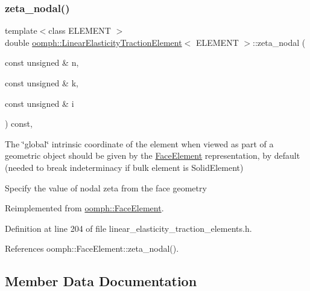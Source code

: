\subsubsection{\texorpdfstring{zeta\+\_\+nodal()}{zeta\_nodal()}}
{\footnotesize\ttfamily template$<$class E\+L\+E\+M\+E\+NT $>$ \\
double \hyperlink{classoomph_1_1LinearElasticityTractionElement}{oomph\+::\+Linear\+Elasticity\+Traction\+Element}$<$ E\+L\+E\+M\+E\+NT $>$\+::zeta\+\_\+nodal (\begin{DoxyParamCaption}\item[{const unsigned \&}]{n,  }\item[{const unsigned \&}]{k,  }\item[{const unsigned \&}]{i }\end{DoxyParamCaption}) const\hspace{0.3cm}{\ttfamily [inline]}, {\ttfamily [virtual]}}



The \char`\"{}global\char`\"{} intrinsic coordinate of the element when viewed as part of a geometric object should be given by the \hyperlink{classoomph_1_1FaceElement}{Face\+Element} representation, by default (needed to break indeterminacy if bulk element is Solid\+Element) 

Specify the value of nodal zeta from the face geometry 

Reimplemented from \hyperlink{classoomph_1_1FaceElement_a58c9f93705c7741f76c8487d152e68a6}{oomph\+::\+Face\+Element}.



Definition at line 204 of file linear\+\_\+elasticity\+\_\+traction\+\_\+elements.\+h.



References oomph\+::\+Face\+Element\+::zeta\+\_\+nodal().



\subsection{Member Data Documentation}
\mbox{\label{classoomph_1_1LinearElasticityTractionElement_a6a7b937fe5bae53dd6cd8d7c1f336c4f}} 
